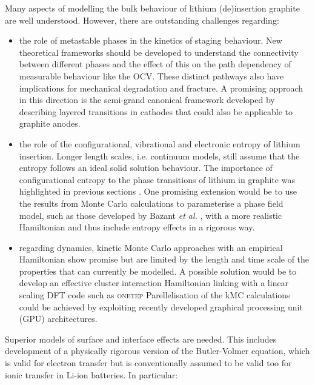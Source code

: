 \documentclass[../main.tex]{subfiles}
\begin{document}
Many aspects of modelling the bulk behaviour of lithium (de)insertion graphite are well understood. However, there are outstanding challenges regarding:
    \begin{itemize}
        \item the role of metastable phases in the kinetics of staging behaviour. New theoretical frameworks should be developed to understand the connectivity between different phases and the effect of this on the path dependency of measurable behaviour like the OCV. These distinct pathways also have implications for mechanical degradation and fracture. A promising approach in this direction is the semi-grand canonical framework developed by \citeauthor{VanderVen2020} describing layered transitions in cathodes \cite{VanderVen2020,radin_role_2017,Vinck2016} that could also be applicable to graphite anodes. 
        \item the role of the configurational, vibrational and electronic entropy of lithium insertion. Longer length scales, i.e. continuum models, still assume that the entropy follows an ideal solid solution behaviour. The importance of configurational entropy to the phase transitions of lithium in graphite was highlighted in previous sections \cite{Mercer2019,Mercer2021,REYNIER2003850}. One promising extension would be to use the results from Monte Carlo calculations to parameterise a phase field model, such as those developed by Bazant \textit{et al.} \cite{Bazant2017,guo2016,peng2011}, with a more realistic Hamiltonian and thus include entropy effects in a rigorous way.
        \item regarding dynamics, kinetic Monte Carlo approaches with an empirical Hamiltonian show promise \cite{gavilan-arriazu_kinetic_2020,gavilan-arriazu_effect_2020,GAVILANARRIAZU2018133} but are limited by the length and time scale of the properties that can currently be modelled. A possible solution would be to develop an effective cluster interaction Hamiltonian linking with a linear scaling DFT code such as \textsc{onetep} Parellelisation of the kMC calculations could be achieved by exploiting recently developed graphical processing unit (GPU) architectures.
    \end{itemize}
Superior models of surface and interface effects are needed. This includes development of a physically rigorous version of the Butler-Volmer equation, which is valid for electron transfer but is conventionally assumed to be valid too for ionic transfer in Li-ion batteries. In particular:
\end{document}

